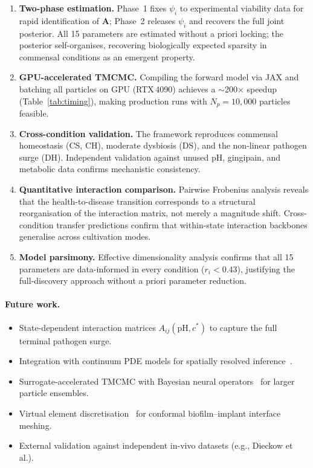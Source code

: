 \documentclass[11pt,a4paper]{article}
\begin{document}
\begin{enumerate}[nosep,leftmargin=*]
\item \textbf{Two-phase estimation.}
Phase~1 fixes $\psi_i$ to experimental viability data for rapid identification of $\mathbf{A}$; Phase~2 releases $\psi_i$ and recovers the full joint posterior.
All 15 parameters are estimated without a priori locking; the posterior self-organises, recovering biologically expected sparsity in commensal conditions as an emergent property.

\item \textbf{GPU-accelerated TMCMC.}
Compiling the forward model via JAX and batching all particles on GPU (RTX\,4090) achieves a $\sim$200$\times$ speedup (Table~\ref{tab:timing}), making production runs with $N_p=10{,}000$ particles feasible.

\item \textbf{Cross-condition validation.}
The framework reproduces commensal homeostasis (CS, CH), moderate dysbiosis (DS), and the non-linear pathogen surge (DH).
Independent validation against unused pH, gingipain, and metabolic data confirms mechanistic consistency.

\item \textbf{Quantitative interaction comparison.}
Pairwise Frobenius analysis reveals that the health-to-disease transition corresponds to a structural reorganisation of the interaction matrix, not merely a magnitude shift.
Cross-condition transfer predictions confirm that within-state interaction backbones generalise across cultivation modes.

\item \textbf{Model parsimony.}
Effective dimensionality analysis confirms that all 15 parameters are data-informed in every condition ($r_i<0.43$), justifying the full-discovery approach without a priori parameter reduction.
\end{enumerate}

\paragraph{Future work.}
\begin{itemize}[nosep,leftmargin=*]
    \item State-dependent interaction matrices $A_{ij}(\mathrm{pH}, c^*)$ to capture the full terminal pathogen surge.
    \item Integration with continuum PDE models for spatially resolved inference~\cite{Klempt2025ContinuumBiofilm}.
    \item Surrogate-accelerated TMCMC with Bayesian neural operators~\cite{AlphaVIDeepONet2025} for larger particle ensembles.
    \item Virtual element discretisation~\cite{Klempt2024ContinuumGrowth} for conformal biofilm--implant interface meshing.
    \item External validation against independent in-vivo datasets (e.g., Dieckow et al.).
\end{itemize}
\end{document}
